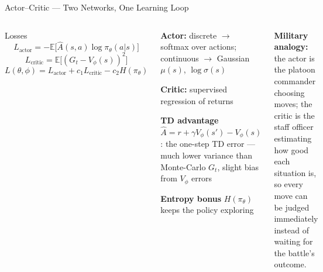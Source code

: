 \documentclass[aspectratio=169,10pt,t]{beamer}
\begin{document}
\begin{frame}{Actor--Critic --- Two Networks, One Learning Loop}
\begin{columns}[T]
\begin{fbx}{Losses}\[L_{\text{actor}}=-\mathbb{E}\big[\hat A(s,a)\log\pi_\theta(a|s)\big]\]\[L_{\text{critic}}=\mathbb{E}\big[(G_t-V_\phi(s))^{2}\big]\]\[L(\theta,\phi)=L_{\text{actor}}+c_1L_{\text{critic}}-c_2H(\pi_\theta)\]\end{fbx}
\begin{tl}\item \textbf{Actor:} discrete $\to$ softmax over actions; continuous $\to$ Gaussian $\mu(s)$, $\log\sigma(s)$\item \textbf{Critic:} supervised regression of returns\item \textbf{TD advantage} $\hat A=r+\gamma V_\phi(s')-V_\phi(s)$: the one-step TD error --- much lower variance than Monte-Carlo $G_t$, slight bias from $V_\phi$ errors\item \textbf{Entropy bonus} $H(\pi_\theta)$ keeps the policy exploring\end{tl}
\begin{ibox}\scriptsize\textbf{Military analogy:} the actor is the platoon commander choosing moves; the critic is the staff officer estimating how good each situation is, so every move can be judged immediately instead of waiting for the battle's outcome.\end{ibox}
\end{columns}
\end{frame}
\end{document}
